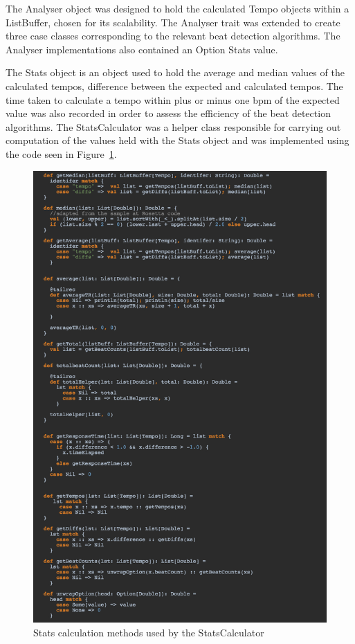 \documentclass[a4paper, 11pt]{article}
\begin{document}
The Analyser object was designed to hold the calculated Tempo objects within a ListBuffer, chosen for its scalability. The Analyser trait was extended to create three case classes corresponding to the relevant beat detection algorithms. The Analyser implementations also contained an Option Stats value.\par
The Stats object is an object used to hold the average and median values of the calculated tempos, difference between the expected and calculated tempos. The time taken to calculate a tempo within plus or minus one bpm of the expected value was also recorded in order to assess the efficiency of the beat detection algorithms. The StatsCalculator was a helper class responsible for carrying out computation of the values held with the Stats object and was implemented using the code seen in Figure~\ref{fig: statsC}.

\begin{figure}[htbp]
\centering
\includegraphics[scale=0.35]{images/statscalc.jpg}
\caption{Stats calculation methods used by the StatsCalculator}
\label{fig: statsC}
\end{figure}
\end{document}
